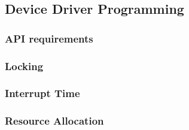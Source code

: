\subsection{Device Driver Programming} %
\begin{frame}[fragile]
    \frametitle{API requirements}
\end{frame}
% 
% 
% 
% 
\begin{frame}[fragile]
    \frametitle{Locking}
\end{frame}
% 
\begin{frame}[fragile]
    \frametitle{Interrupt Time}
\end{frame}
% 
% 
\begin{frame}[fragile]
    \frametitle{Resource Allocation}
\end{frame}
% 

